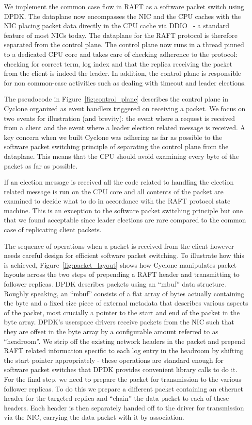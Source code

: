 \documentclass[10pt, preprint, nonatbib]{sigplanconf}
\begin{document}
We implement the common case flow in RAFT as a software packet switch using
DPDK. The dataplane now encompasses the NIC and the CPU caches with the NIC
placing packet data directly in the CPU cache via DDIO~\cite{ddio} - a standard
feature of most NICs today. The dataplane for the RAFT protocol is therefore
separated from the control plane. The control plane now runs in a thread pinned
to a dedicated CPU core and takes care of checking adherence to the protocol:
checking for correct term, log index and that the replica receiving the packet
from the client is indeed the leader. In addition, the control plane is
responsible for non common-case activities such as dealing with timeout and
leader elections.

The pseudocode in Figure~\ref{fig:control_plane} describes the control plane in
Cyclone organized as event handlers triggered on receiving a packet. We focus on
two events for illustration (and brevity): the event where a request is received
from a client and the event where a leader election related message is
received. A key concern when we built Cyclone was adhering as far as possible to
the software packet switching principle of separating the control plane from the
dataplane. This means that the CPU should avoid examining every byte of the
packet as far as possible.

If an election message is received all the code related to handling
the election related message is run on the CPU core and all contents of the
packet are examined to decide what to do in accordance with the RAFT protocol
state machine. This is an exception to the software packet switching principle
but one that we found acceptable since leader elections are rare compared to the
common case of replicating client packets.

The sequence of operations when a packet is received from the client however
needs careful design for efficient software packet switching. To illustrate how
this is achieved, Figure~\ref{fig:packet_layout} shows how Cyclone manipulates
packet layouts across the two steps of prepending a RAFT header and transmitting
to follower replicas. DPDK describes packets using an ``mbuf'' data
structure. Roughly speaking, an ``mbuf'' consists of a flat array of bytes
actually containing the byte and a fixed size piece of external metadata that
describes various aspects of the packet, most crucially a pointer to the start
and end of the packet in the byte array. DPDK's userspace drivers receive
packets from the NIC such that they are offset in the byte array by a
configurable amount referred to as ``headroom''. We strip off the existing
network headers in the packet and prepend RAFT related information specific to
each log entry in the headroom by shifting the start pointer appropriately -
these operations are standard enough for software packet switches that DPDK
provides convenient library calls to do it. For the final step, we need to
prepare the packet for transmission to the various follower replicas. To do this
we prepare a different packet containing an ethernet header for the targeted
replica and ``chain'' the data packet to each of these headers. Each header is
then separately handed off to the driver for transmission via the NIC, carrying
the data packet with it by association.
\end{document}
